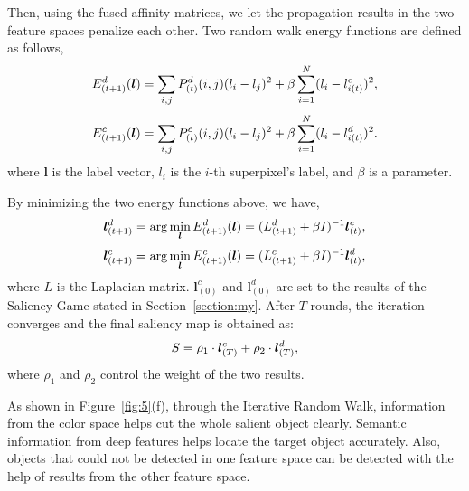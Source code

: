 \documentclass[journal]{IEEEtran}
\begin{document}
Then, using the fused affinity matrices, we let the propagation results in the two feature spaces penalize each other. Two random walk energy functions are defined as follows,
\begin{equation}
\setlength{\abovedisplayskip}{2pt}
\setlength{\belowdisplayskip}{2pt}
\small
\label{our1}
E^d_{(t+1)}(\boldsymbol{l}) = \sum_{i,j} P^d_{(t)}(i,j) (l_i - l_j)^2 + \beta \sum_{i=1}^N (l_i - l^c_{i(t)})^2, 
\end{equation}
\begin{equation}
\setlength{\abovedisplayskip}{2pt}
\setlength{\belowdisplayskip}{2pt}
\small
\label{our2}
E^c_{(t+1)}(\boldsymbol{l}) = \sum_{i,j} P^c_{(t)}(i,j) (l_i - l_j)^2 + \beta \sum_{i=1}^N (l_i - l^d_{i(t)})^2. 
\end{equation}
\noindent where $\boldsymbol{l}$ is the label vector, $l_i$ is the $i$-th superpixel's label, and $\beta$ is a parameter.

By minimizing the two energy functions above, we have,
\begin{equation}
\setlength{\abovedisplayskip}{2pt}
\setlength{\belowdisplayskip}{2pt}
\label{cross1}
\boldsymbol{l}^d_{(t+1)} = \arg\min_{\boldsymbol{l}} E^d_{(t+1)}(\boldsymbol{l}) = (L^d_{(t+1)} + \beta I)^{-1} \boldsymbol{l}^c_{(t)}, 
\end{equation}
\begin{equation}
\setlength{\abovedisplayskip}{2pt}
\setlength{\belowdisplayskip}{2pt}
\label{cross2}
\boldsymbol{l}^c_{(t+1)} = \arg\min_{\boldsymbol{l}} E^c_{(t+1)}(\boldsymbol{l}) = (L^c_{(t+1)} + \beta I)^{-1} \boldsymbol{l}^d_{(t)}, 
\end{equation}
where $L$ is the Laplacian matrix. $\boldsymbol{l}^c_{(0)}$ and $\boldsymbol{l}^d_{(0)}$ are set to the results of the Saliency Game stated in Section~\ref{section:my}. After $T$ rounds, the iteration converges and the final saliency map is obtained as:
\begin{equation}
\setlength{\abovedisplayskip}{2pt}
\setlength{\belowdisplayskip}{2pt}
\label{final}
S = \rho_1 \cdot \boldsymbol{l}^c_{(T)} + \rho_2 \cdot \boldsymbol{l}^d_{(T)}, 
\end{equation}
where $\rho_1$ and $\rho_2$ control the weight of the two results.

As shown in Figure~\ref{fig:5}(f), through the Iterative Random Walk, information from the color space helps cut the whole salient object clearly. Semantic information from deep features helps locate the target object accurately. Also, objects that could not be detected in one feature space can be detected with the help of results from the other feature space. 
\end{document}
